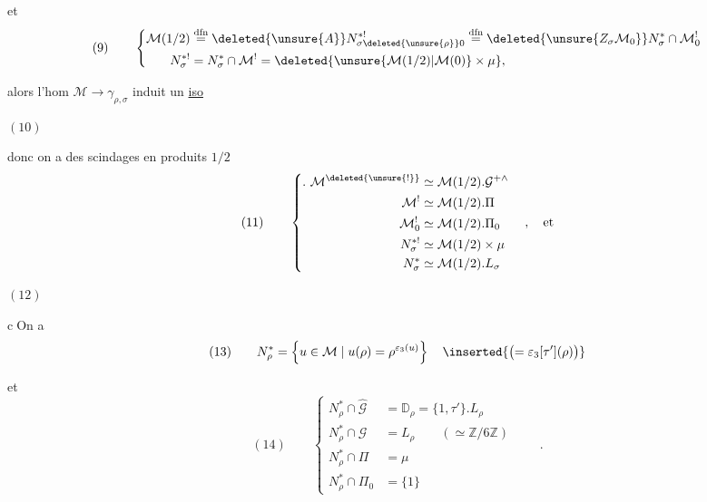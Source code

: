 et
\[
(9)\qquad
\left\{\begin{aligned}
\mathcal M(1/2)
&\overset{\mathrm{dfn}}=
\deleted{\unsure{A}}N_{\sigma\deleted{\unsure{\rho}}0}^{*!}
\overset{\mathrm{dfn}}=
\deleted{\unsure{Z_\sigma\mathcal M_0}}N_\sigma^*\cap\mathcal M_0^!\\
N_\sigma^{*!}&=N_\sigma^*\cap\mathcal M^!
=\deleted{\unsure{\mathcal M(1/2)|\mathcal M(0)}\times\mu},
\end{aligned}\right.
\]

alors l'hom  $\mathcal M\to\gamma_{\rho,\sigma}$
induit un \uline{iso}

\( (10) \)\quad
{}

donc on a des scindages en produits $1/2$ 
\[
(11)\qquad
\left\{\begin{aligned}
.\ \mathcal M^{\deleted{\unsure{!}}}
  &\simeq\mathcal M(1/2).\mathcal G^{+\wedge}\\
\mathcal M^!&\simeq\mathcal M(1/2).\Pi\\
\mathcal M_0^!&\simeq\mathcal M(1/2).\Pi_0\\
N_\sigma^{*!}&\simeq\mathcal M(1/2)\times\mu\\
N_\sigma^*&\simeq\mathcal M(1/2).L_\sigma
\end{aligned}\right.\quad,\quad\text{et}
\]

\( (12) \)\quad
{}


\textcircled{c}\quad On a
\[
(13)\qquad
N_\rho^*=\left\{u\in\mathcal M\mid u(\rho)=\rho^{\varepsilon_3(u)}\right\}
\quad\inserted{\bigl(=\varepsilon_3[\tau'](\rho)\bigr)}
\]

et
\[
(14)\qquad
\left\{\begin{aligned}
N_\rho^*\cap\widehat{\mathcal G}
  &=\mathbb D_\rho=\{1,\tau'\}.L_\rho\\
N_\rho^*\cap\mathcal G
  &=L_\rho\qquad(\simeq\mathbb Z/6\mathbb Z)\\
N_\rho^*\cap\Pi&=\mu\\
N_\rho^*\cap\Pi_0&=\{1\}
\end{aligned}\right.\qquad .
\]

